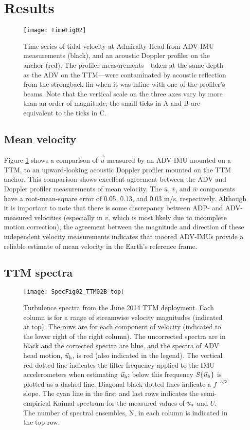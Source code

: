 \section{Results}
\label{sec:results}

\begin{figure}[t]
  \centering
  \texttt{[image: TimeFig02]}
  \caption{Time series of tidal velocity at Admiralty Head from ADV-IMU measurements (black), and an acoustic Doppler profiler on the anchor (red). The profiler measurements---taken at the same depth as the ADV on the TTM---were contaminated by acoustic reflection from the strongback fin when it was inline with one of the profiler's beams. Note that the vertical scale on the three axes vary by more than an order of magnitude; the small ticks in A and B are equivalent to the ticks in C.}
  \label{fig:vel_time}
\end{figure}

\subsection{Mean velocity}

Figure \ref{fig:vel_time} shows a comparison of $\vec{\bar u}$ measured by an ADV-IMU mounted on a TTM, to an upward-looking acoustic Doppler profiler mounted on the TTM anchor. This comparison shows excellent agreement between the ADV and Doppler profiler measurements of mean velocity. The $\bar u$, $\bar v$, and $\bar w$ components have a root-mean-square error of 0.05, 0.13, and 0.03 m/s, respectively. Although it is important to note that there is some discrepancy between ADP- and ADV-measured velocities (especially in $\bar v$, which is most likely due to incomplete motion correction), the agreement between the magnitude and direction of these independent velocity measurements indicates that moored ADV-IMUs provide a reliable estimate of mean velocity in the Earth's reference frame.

\subsection{TTM spectra}

\begin{figure*}[t]
  \centering
  \texttt{[image: SpecFig02\_TTM02B-top]}
  \caption{Turbulence spectra from the June 2014 TTM deployment. Each column is for a range of streamwise velocity magnitudes (indicated at top). The rows are for each component of velocity (indicated to the lower right of the right column). The uncorrected spectra are in black and the corrected spectra are blue, and the spectra of ADV head motion, $\vec{u}_\mathrm{h}$, is red (also indicated in the legend). The vertical red dotted line indicates the filter frequency applied to the IMU accelerometers when estimating $\vec{u}_\mathrm{h}$; below this frequency $S\{\vec{u}_\mathrm{h}\}$ is plotted as a dashed line.   Diagonal black dotted lines indicate a $f^{-5/3}$ slope. The cyan line in the first and last rows indicates the semi-empirical Kaimal spectrum for the measured values of $u_*$ and $U$. The number of spectral ensembles, N, in each column is indicated in the top row.}
  \label{fig:spec:ttm}
\end{figure*}

